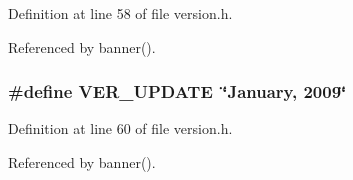 Definition at line 58 of file version.h.

Referenced by banner().
\subsubsection[{VER\_\-UPDATE}]{\setlength{\rightskip}{0pt plus 5cm}\#define VER\_\-UPDATE~\char`\"{}January, 2009\char`\"{}}\label{version_8h_2e6a3298aeedb1bac9a4ef60122a83fa}




Definition at line 60 of file version.h.

Referenced by banner().